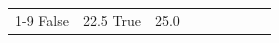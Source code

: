 \begin{table}[H]
\begin{tabular}{lllrlllll}
\cline{1-9}
False & 22.5%
\cline{1-9}
True & 25.0%

\end{tabular}
\end{table}
